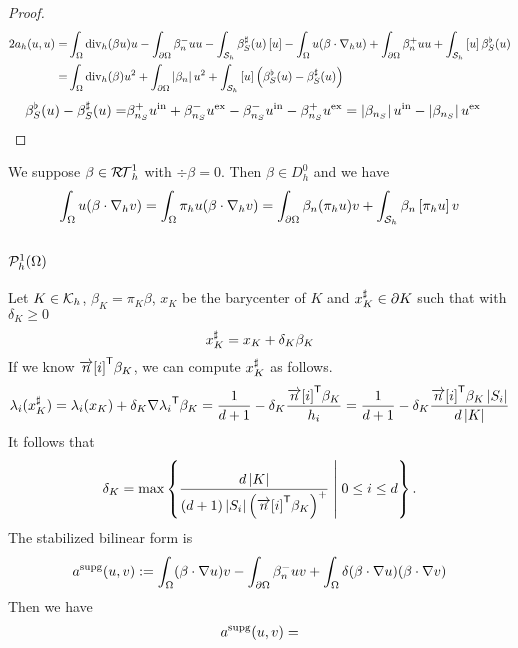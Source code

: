 %
\begin{proof}
%
\begin{align*}
2a_h(u,u) =& \int_{\Omega}\operatorname{div}_h(\beta u) u - \int_{\partial\Omega} \beta_n^- uu - \int_{\mathcal S_h}\beta_S^{\sharp}(u) \left[u\right]
- \int_{\Omega}u (\beta\cdot\nabla_h u) + \int_{\partial\Omega} \beta_n^+ uu + \int_{\mathcal S_h}\left[u\right]\beta_S^{\flat}(u)\\
=&\int_{\Omega}\operatorname{div}_h(\beta) u^2 + \int_{\partial\Omega} \left|\beta_n\right| u^2+ \int_{\mathcal S_h}\left[u\right]\left(\beta_S^{\flat}(u)-\beta_S^{\sharp}(u)\right)
\end{align*}
%
%
\begin{align*}
\beta_S^{\flat}(u)-\beta_S^{\sharp}(u) =&  \beta_{n_S}^{+}u^{\rm in} + \beta_{n_S}^{-}u^{\rm ex} - \beta_{n_S}^{-}u^{\rm in} - \beta_{n_S}^{+}u^{\rm ex}= \left|\beta_{n_S}\right|u^{\rm in} - \left|\beta_{n_S}\right|u^{\rm ex}
\end{align*}
%
\end{proof}
%


We suppose $\beta\in \mathcal{R\!T}^1_h$ with $\div\beta=0$. Then $\beta\in D^0_h$ and we have
%
\begin{align*}
\int_{\Omega}u (\beta\cdot\nabla_h v) = \int_{\Omega}\pi_h u (\beta\cdot\nabla_h v) = 
\int_{\partial\Omega}\beta_n (\pi_h u) v +  \int_{\mathcal S_h}\beta_n \left[\pi_h u\right] v
\end{align*}
%


%
\subsection{$\mathcal{P}^1_h(\Omega)$}\label{subsec:}
%
%
Let $K\in\mathcal K_h$, $\beta_K=\pi_K\beta$, $x_K$ be the barycenter of $K$ and $x_{K}^{\sharp}\in\partial K$ such that  with 
$\delta_K\ge0$
%
\begin{equation}\label{eq:}
x_{K}^{\sharp} = x_K + \delta_K \beta_K
\end{equation}
%
If we know ${\mathbf{\overrightarrow{n}}[i]}^{\mathsf{T}}\beta_K$, we can compute $x_{K}^{\sharp}$ as follows.
%
\begin{align*}
\lambda_i(x_{K}^{\sharp}) = \lambda_i(x_K) + \delta_K {\nabla\lambda_i}^{\mathsf{T}}\beta_K
= \frac{1}{d+1} - \delta_K \frac{{\mathbf{\overrightarrow{n}}[i]}^{\mathsf{T}}\beta_K}{h_i}
= \frac{1}{d+1} - \delta_K \frac{{\mathbf{\overrightarrow{n}}[i]}^{\mathsf{T}}\beta_K \left|S_i\right|}{d\left|K\right|}
\end{align*}
%
It follows that
%
\begin{equation}\label{eq:}
\delta_K = \max\left\{\frac{d\left|K\right|}{(d+1)\left|S_i\right|\left({\mathbf{\overrightarrow{n}}[i]}^{\mathsf{T}}\beta_K\right)^+}\;\middle|\;0\le i\le d\right\}.
\end{equation}
%
The stabilized bilinear form is
%
\begin{equation}\label{eq:}
a^{\rm supg}(u,v) := \int_{\Omega} (\beta\cdot \nabla  u) v - \int_{\partial\Omega} \beta_n^- uv + \int_{\Omega} \delta(\beta\cdot \nabla u)( \beta\cdot \nabla v)
\end{equation}
%
Then we have
%
\begin{align*}
a^{\rm supg}(u,v) = 
\end{align*}
%



\printbibliography[title=References Section~\thesection]

